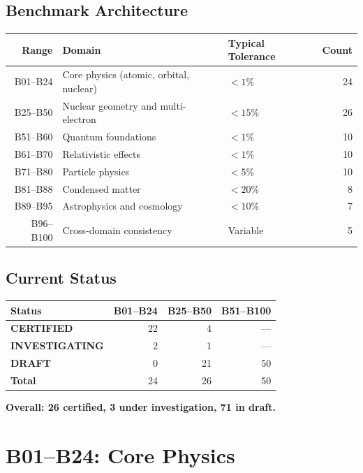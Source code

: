 \documentclass[12pt,a4paper]{report}
\newcommand{\PASS}{\textcolor{pass}{\textbf{CERTIFIED}}}
\newcommand{\DRAFT}{\textcolor{draft}{\textbf{DRAFT}}}
\newcommand{\INVEST}{\textcolor{invest}{\textbf{INVESTIGATING}}}
\begin{document}
\section{Benchmark Architecture}

\begin{center}
\begin{tabular}{rllr}
\toprule
\textbf{Range} & \textbf{Domain} & \textbf{Typical Tolerance} & \textbf{Count} \\
\midrule
B01--B24 & Core physics (atomic, orbital, nuclear) & $<1\%$ & 24 \\
B25--B50 & Nuclear geometry and multi-electron & $<15\%$ & 26 \\
B51--B60 & Quantum foundations & $<1\%$ & 10 \\
B61--B70 & Relativistic effects & $<1\%$ & 10 \\
B71--B80 & Particle physics & $<5\%$ & 10 \\
B81--B88 & Condensed matter & $<20\%$ & 8 \\
B89--B95 & Astrophysics and cosmology & $<10\%$ & 7 \\
B96--B100 & Cross-domain consistency & Variable & 5 \\
\bottomrule
\end{tabular}
\end{center}


\section{Current Status}

\begin{center}
\begin{tabular}{lrrr}
\toprule
\textbf{Status} & \textbf{B01--B24} & \textbf{B25--B50} & \textbf{B51--B100} \\
\midrule
\PASS & 22 & 4 & --- \\
\INVEST & 2 & 1 & --- \\
\DRAFT & 0 & 21 & 50 \\
\midrule
\textbf{Total} & 24 & 26 & 50 \\
\bottomrule
\end{tabular}
\end{center}

\textbf{Overall: 26 certified, 3 under investigation, 71 in draft.}


\chapter{B01--B24: Core Physics}
\label{ch:b01-b24}
\end{document}
